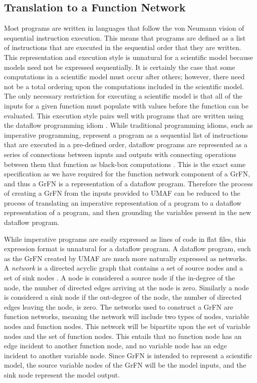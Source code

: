 \subsection{Translation to a Function Network \label{sec:trans_to_dfm}}
Most programs are written in languages that follow the von Neumann vision of sequential instruction execution.
This means that programs are defined as a list of instructions that are executed in the sequential order that they are written.
This representation and execution style is unnatural for a scientific model because models need not be expressed sequentially.
It is certainly the case that some computations in a scientific model must occur after others; however, there need not be a total ordering upon the computations included in the scientific model.
The only necessary restriction for executing a scientific model is that all of the inputs for a given function must populate with values before the function can be evaluated.
This execution style pairs well with programs that are written using the dataflow programming idiom \citep{johnston2004dataflowadvances}.
While traditional programming idioms, such as imperative programming, represent a program as a sequential list of instructions that are executed in a pre-defined order, dataflow programs are represented as a series of connections between inputs and outputs with connecting operations between them that function as black-box computations \citep{wadge1985lucid}.
This is the exact same specification as we have required for the function network component of a GrFN, and thus a GrFN is a representation of a dataflow program.
Therefore the process of creating a GrFN from the inputs provided to UMAF can be reduced to the process of translating an imperative representation of a program to a dataflow representation of a program, and then grounding the variables present in the new dataflow program.

While imperative programs are easily expressed as lines of code in flat files, this expression format is unnatural for a dataflow program.
A dataflow program, such as the GrFN created by UMAF are much more naturally expressed as networks.
A \emph{network} is a directed acyclic graph that contains a set of source nodes and a set of sink nodes \citep{bondy1976graph}.
A node is considered a source node if the in-degree of the node, the number of directed edges arriving at the node is zero.
Similarly a node is considered a sink node if the out-degree of the node, the number of directed edges leaving the node, is zero.
The networks used to construct a GrFN are function networks, meaning the network will include two types of nodes, variable nodes and function nodes.
This network will be bipartite upon the set of variable nodes and the set of function nodes.
This entails that no function node has an edge incident to another function node, and no variable node has an edge incident to another variable node.
Since GrFN is intended to represent a scientific model, the source variable nodes of the GrFN will be the model inputs, and the sink node represent the model output.

